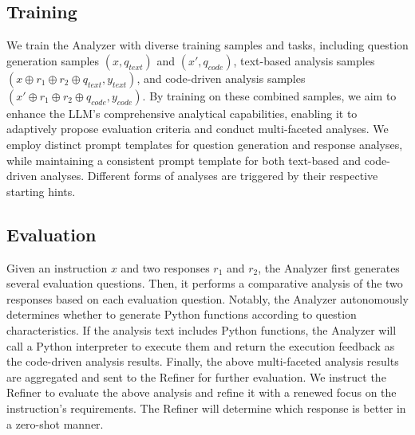 \subsection{Training}
We train the Analyzer with diverse training samples and tasks, including question generation samples $(x, q_{text})$ and $(x', q_{code})$, text-based analysis samples $(x \oplus r_1 \oplus r_2 \oplus q_{text}, y_{text})$, and code-driven analysis samples $(x' \oplus r_1 \oplus r_2 \oplus q_{code}, y_{code})$. By training on these combined samples, we aim to enhance the LLM's comprehensive analytical capabilities, enabling it to adaptively propose evaluation criteria and conduct multi-faceted analyses. We employ distinct prompt templates for question generation and response analyses, while maintaining a consistent prompt template for both text-based and code-driven analyses. Different forms of analyses are triggered by their respective starting hints. 

\subsection{Evaluation}
Given an instruction $x$ and two responses $r_1$ and $r_2$, the Analyzer first generates several evaluation questions. Then, it performs a comparative analysis of the two responses based on each evaluation question. Notably, the Analyzer autonomously determines whether to generate Python functions according to question characteristics. If the analysis text includes Python functions, the Analyzer will call a Python interpreter to execute them and return the execution feedback as the code-driven analysis results. Finally, the above multi-faceted analysis results are aggregated and sent to the Refiner for further evaluation. We instruct the Refiner to evaluate the above analysis and refine it with a renewed focus on the instruction's requirements. The Refiner will determine which response is better in a zero-shot manner. 